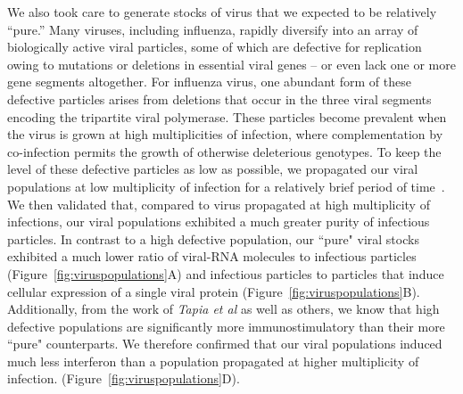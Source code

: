 \documentclass[9pt,lineno]{elife}
\begin{document}
We also took care to generate stocks of virus that we expected to be relatively ``pure.''
Many viruses, including influenza, rapidly diversify into an array of biologically active viral particles, some of which are defective for replication owing to mutations or deletions in essential viral genes -- or even lack one or more gene segments altogether.
For influenza virus, one abundant form of these defective particles arises from deletions that occur in the three viral segments encoding the tripartite viral polymerase.
These particles become prevalent when the virus is grown at high multiplicities of infection, where complementation by co-infection permits the growth of otherwise deleterious genotypes.
To keep the level of these defective particles as low as possible, we propagated our viral populations at low multiplicity of infection for a relatively brief period of time~\citep{xue2016propagation}.
We then validated that, compared to virus propagated at high multiplicity of infections, our viral populations exhibited a much greater purity of infectious particles.
In contrast to a high defective population, our ``pure" viral stocks exhibited a much lower ratio of viral-RNA molecules to infectious particles (Figure~\ref{fig:viruspopulations}A) and infectious particles to particles that induce cellular expression of a single viral protein (Figure~\ref{fig:viruspopulations}B).
Additionally, from the work of \emph{Tapia et al} as well as others, we know that high defective populations are significantly more immunostimulatory than their more ``pure" counterparts.
We therefore confirmed that our viral populations induced much less interferon than a population propagated at higher multiplicity of infection. (Figure~\ref{fig:viruspopulations}D).
\end{document}
